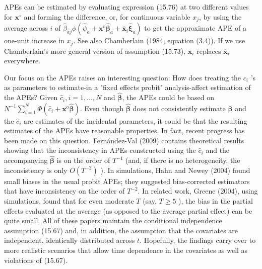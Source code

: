 \documentclass[10pt]{article}
\begin{document}
APEs can be estimated by evaluating expression (15.76) at two different values for $\mathbf{x}^{\circ}$ and forming the difference, or, for continuous variable $x_{j}$, by using the average across $i$ of $\hat{\beta}_{a j} \phi\left(\hat{\psi}_{a}+\mathbf{x}^{\mathrm{o}} \hat{\boldsymbol{\beta}}_{a}+\overline{\mathbf{x}}_{i} \hat{\boldsymbol{\xi}}_{a}\right)$ to get the approximate APE of a one-unit increase in $x_{j}$. See also Chamberlain (1984, equation (3.4)). If we use Chamberlain's more general version of assumption (15.73), $\mathbf{x}_{i}$ replaces $\overline{\mathbf{x}}_{i}$ everywhere.

Our focus on the APEs raises an interesting question: How does treating the $c_{i}$ 's as parameters to estimate-in a "fixed effects probit" analysis-affect estimation of the APEs? Given $\hat{c}_{i}, i=1, \ldots, N$ and $\hat{\boldsymbol{\beta}}$, the APEs could be based on\\
$N^{-1} \sum_{i=1}^{N} \Phi\left(\hat{c}_{i}+\mathbf{x}^{\mathrm{o}} \hat{\boldsymbol{\beta}}\right)$. Even though $\hat{\boldsymbol{\beta}}$ does not consistently estimate $\boldsymbol{\beta}$ and the $\hat{c}_{i}$ are estimates of the incidental parameters, it could be that the resulting estimates of the APEs have reasonable properties. In fact, recent progress has been made on this question. Fernández-Val (2009) contains theoretical results showing that the inconsistency in APEs constructed using the $\hat{c}_{i}$ and the accompanying $\hat{\boldsymbol{\beta}}$ is on the order of $T^{-1}$ (and, if there is no heterogeneity, the inconsistency is only $O\left(T^{-2}\right)$ ). In simulations, Hahn and Newey (2004) found small biases in the usual probit APEs; they suggested bias-corrected estimators that have inconsistency on the order of $T^{-2}$. In related work, Greene (2004), using simulations, found that for even moderate $T$ (say, $T \geq 5$ ), the bias in the partial effects evaluated at the average (as opposed to the average partial effect) can be quite small. All of these papers maintain the conditional independence assumption (15.67) and, in addition, the assumption that the covariates are independent, identically distributed across $t$. Hopefully, the findings carry over to more realistic scenarios that allow time dependence in the covariates as well as violations of (15.67).
\end{document}
